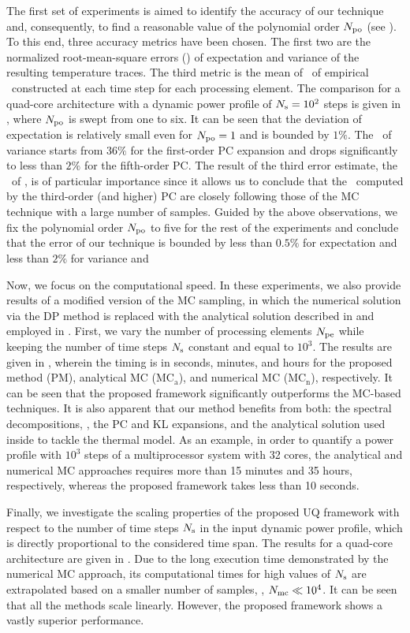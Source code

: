 The first set of experiments is aimed to identify the accuracy of our technique and, consequently, to find a reasonable value of the polynomial order ${N_\text{po}}$ (see ). To this end, three accuracy metrics have been chosen. The first two are the normalized root-mean-square errors (\nrmse) of expectation and variance of the resulting temperature traces. The third metric is the mean of \nrmses\ of empirical \pdfs\ constructed at each time step for each processing element. The comparison for a quad-core architecture with a dynamic power profile of $N_\text{s} = 10^2$ steps is given in , where ${N_\text{po}}$ is swept from one to six. It can be seen that the deviation of expectation is relatively small even for ${N_\text{po}} = 1$ and is bounded by $1\%$. The \nrmse\ of variance starts from $36\%$ for the first-order PC expansion and drops significantly to less than $2\%$ for the fifth-order PC. The result of the third error estimate, the \nrmse\ of \pdfs, is of particular importance since it allows us to conclude that the \pdfs\ computed by the third-order (and higher) PC are closely following those of the MC technique with a large number of samples. Guided by the above observations, we fix the polynomial order ${N_\text{po}}$ to five for the rest of the experiments and conclude that the error of our technique is bounded by less than $0.5\%$ for expectation and less than $2\%$ for variance and \pdf


Now, we focus on the computational speed. In these experiments, we also provide results of a modified version of the MC sampling, in which the numerical solution via the DP method is replaced with the analytical solution described in  and employed in . First, we vary the number of processing elements ${N_\text{pe}}$ while keeping the number of time steps $N_\text{s}$ constant and equal to $10^3$. The results are given in , wherein the timing is in seconds, minutes, and hours for the proposed method (PM), analytical MC ($\text{MC}_\text{a}$), and numerical MC ($\text{MC}_\text{n}$), respectively. It can be seen that the proposed framework significantly outperforms the MC-based techniques. It is also apparent that our method benefits from both: the spectral decompositions, \ie, the PC and KL expansions, and the analytical solution used inside to tackle the thermal model. As an example, in order to quantify a power profile with $10^3$ steps of a multiprocessor system with 32 cores, the analytical and numerical MC approaches requires more than 15 minutes and 35 hours, respectively, whereas the proposed framework takes less than 10 seconds.

Finally, we investigate the scaling properties of the proposed UQ framework with respect to the number of time steps $N_\text{s}$ in the input dynamic power profile, which is directly proportional to the considered time span. The results for a quad-core architecture are given in . Due to the long execution time demonstrated by the numerical MC approach, its computational times for high values of $N_\text{s}$ are extrapolated based on a smaller number of samples, \ie, $N_\text{mc} \ll 10^4$. It can be seen that all the methods scale linearly. However, the proposed framework shows a vastly superior performance.
